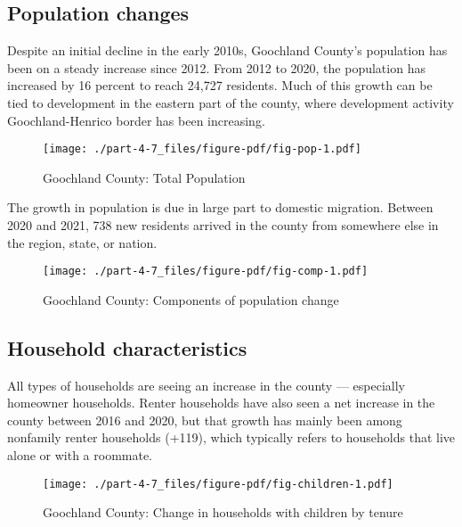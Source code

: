 \documentclass[
  letterpaper,
  DIV=11,
  numbers=noendperiod]{scrreprt}
\begin{document}
\hypertarget{population-changes-6}{%
\subsection{Population changes}\label{population-changes-6}}

Despite an initial decline in the early 2010s, Goochland County's
population has been on a steady increase since 2012. From 2012 to 2020,
the population has increased by 16 percent to reach 24,727 residents.
Much of this growth can be tied to development in the eastern part of
the county, where development activity Goochland-Henrico border has been
increasing.

\begin{figure}

{\centering \texttt{[image: ./part-4-7\_files/figure-pdf/fig-pop-1.pdf]}

}

\caption{\label{fig-pop}Goochland County: Total Population}

\end{figure}

The growth in population is due in large part to domestic migration.
Between 2020 and 2021, 738 new residents arrived in the county from
somewhere else in the region, state, or nation.

\begin{figure}

{\centering \texttt{[image: ./part-4-7\_files/figure-pdf/fig-comp-1.pdf]}

}

\caption{\label{fig-comp}Goochland County: Components of population
change}

\end{figure}

\hypertarget{household-characteristics-6}{%
\subsection{Household
characteristics}\label{household-characteristics-6}}

All types of households are seeing an increase in the county ---
especially homeowner households. Renter households have also seen a net
increase in the county between 2016 and 2020, but that growth has mainly
been among nonfamily renter households (+119), which typically refers to
households that live alone or with a roommate.

\begin{figure}

{\centering \texttt{[image: ./part-4-7\_files/figure-pdf/fig-children-1.pdf]}

}

\caption{\label{fig-children}Goochland County: Change in households with
children by tenure}

\end{figure}
\end{document}
